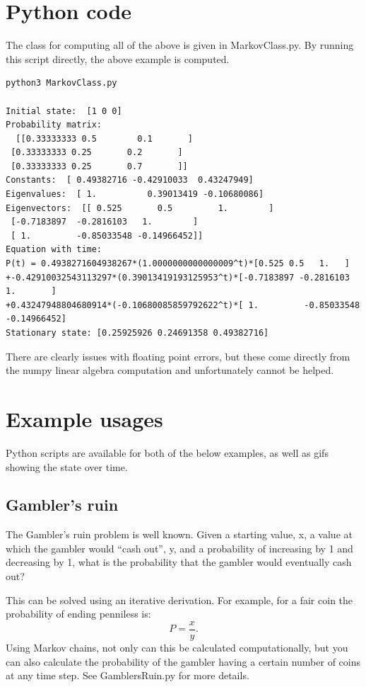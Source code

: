 \documentclass[12pt]{article}
\begin{document}
\section{Python code}
The class for computing all of the above is given in MarkovClass.py.
By running this script directly, the above example is computed.
\begin{verbatim}
python3 MarkovClass.py

Initial state:  [1 0 0]
Probability matrix:
  [[0.33333333 0.5        0.1       ]
 [0.33333333 0.25       0.2       ]
 [0.33333333 0.25       0.7       ]]
Constants:  [ 0.49382716 -0.42910033  0.43247949]
Eigenvalues:  [ 1.          0.39013419 -0.10680086]
Eigenvectors:  [[ 0.525       0.5         1.        ]
 [-0.7183897  -0.2816103   1.        ]
 [ 1.         -0.85033548 -0.14966452]]
Equation with time:
P(t) = 0.4938271604938267*(1.0000000000000009^t)*[0.525 0.5   1.   ] 
+-0.42910032543113297*(0.39013419193125953^t)*[-0.7183897 -0.2816103  1.       ] 
+0.43247948804680914*(-0.10680085859792622^t)*[ 1.         -0.85033548 -0.14966452]
Stationary state: [0.25925926 0.24691358 0.49382716]
\end{verbatim}

There are clearly issues with floating point errors, but these come directly from the numpy linear algebra computation and unfortunately cannot be helped.

\section{Example usages}

Python scripts are available for both of the below examples, as well as gifs showing the state over time.

\subsection{Gambler's ruin}

The Gambler's ruin problem is well known. 
Given a starting value, x, a value at which the gambler would ``cash out'', y, and a probability of increasing by 1 and decreasing by 1, what is the probability that the gambler would eventually cash out?

This can be solved using an iterative derivation. For example, for a fair coin the probability of ending penniless is:
\begin{equation}
	P = \frac{x}{y}.
\end{equation}
Using Markov chains, not only can this be calculated computationally, but you can also calculate the probability of the gambler having a certain number of coins at any time step. See GamblersRuin.py for more details.
\end{document}
